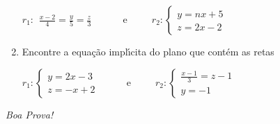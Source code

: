 \documentclass[a4paper,5pt]{amsbook}
\newcommand{\ds}{\displaystyle}
\begin{document}
\begin{enumerate}
	$r_1:\begin{array}{l}
		\ds\frac{x-2}{4} = \frac{y}{5} = \frac{z}{3}
	\end{array}$
	\ \ \ \ \ e\ \ \ \ \ 
	$r_2:\left\{\begin{array}{l}
		y = nx + 5 \\
		z = 2x - 2
	\end{array}\right.$

	\vspace{0.5cm}
	\item Encontre a equa\c{c}\~ao impl\'{\i}cita do plano que cont\'em as retas

		$r_1:\left\{\begin{array}{l}
				y = 2x - 3 \\
				z = -x + 2
			\end{array}\right.$
		\ \ \ \ \ e\ \ \ \ \ 
		$r_2:\left\{\begin{array}{l}
				\frac{x-1}{3} = z-1 \\
				y = -1
			\end{array}\right.$
\end{enumerate}

\begin{flushright}
	\vspace{1cm}
	\textit{Boa Prova!}
\end{flushright}
\end{document}
